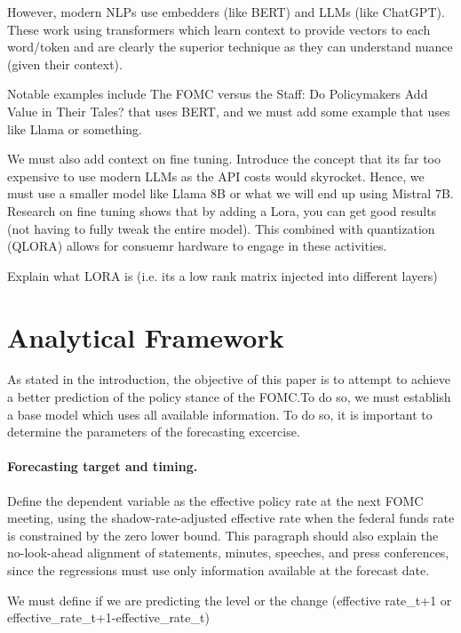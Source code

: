 \documentclass[11pt]{article}
\begin{document}
However, modern NLPs use embedders (like BERT) and LLMs (like ChatGPT). These work using transformers which learn context to provide vectors to each word/token and are clearly the superior technique as they can understand nuance (given their context).

Notable examples include The FOMC versus the Staff: Do Policymakers Add Value in Their Tales? that uses BERT, and we must add some example that uses like Llama or something.

We must also add context on fine tuning. Introduce the concept that its far too expensive to use modern LLMs as the API costs would skyrocket. Hence, we must use a smaller model like Llama 8B or what we will end up using Mistral 7B. Research on fine tuning shows that by adding a Lora, you can get good results (not having to fully tweak the entire model). This combined with quantization (QLORA) allows for consuemr hardware to engage in these activities.

Explain what LORA is (i.e. its a low rank matrix injected into different layers)

\section{Analytical Framework}
As stated in the introduction, the objective of this paper is to attempt to achieve a better prediction of the policy stance of the FOMC.To do so, we must establish a base model which uses all available information. To do so, it is important to determine the parameters of the forecasting excercise.

\paragraph{Forecasting target and timing.} Define the dependent variable as the effective policy rate at the next FOMC meeting, using the shadow-rate-adjusted effective rate when the federal funds rate is constrained by the zero lower bound. This paragraph should also explain the no-look-ahead alignment of statements, minutes, speeches, and press conferences, since the regressions must use only information available at the forecast date. 

We must define if we are predicting the level or the change (effective rate_{t+1} or effective_rate_{t+1}-effective_rate_{t})
\end{document}
